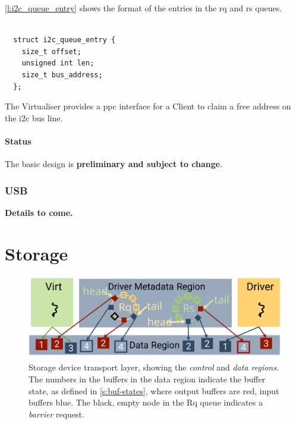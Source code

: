 \documentclass[a4paper,12pt]{report}
\newcommand{\ToCome}[1]{\textbf{#1 to come.}}
\newcommand{\Obj}[1]{\textsl{#1}}
\newcommand{\figscale}{0.2}
\begin{document}
\autoref{l:i2c_queue_entry} shows the format of the entries in the \gls{rq}
and \gls{rs} queues.

\begin{lstlisting}[gobble=2,firstline=2,float=th,
  label={l:i2c_queue_entry},
  caption={I2C request and response queue entry data structure.}]

  struct i2c_queue_entry {
    size_t offset;
    unsigned int len;
    size_t bus_address;
  };
\end{lstlisting}

The Virtualiser provides a \gls{ppc} interface for a Client to claim
a free address on the \gls{i2c} bus line.

\paragraph{Status}

The basic design is \textbf{preliminary and subject to change}.

\subsubsection{USB}\label{s:cl-usb}

\ToCome{Details}

\section{Storage}\label{s:cl-storage}

\begin{figure}[th]
  \centering
  \includegraphics[scale=\figscale]{metadata-storage}
  \caption[Storage device transport layer.]{Storage device transport layer, showing the
    \Obj{control} and \Obj{data regions}. The numbers in the
    buffers in the data region indicate the buffer state, as defined
    in \autoref{s:buf-states}, where output
    buffers are red, input buffers blue. The black, empty node in the
    Rq queue indicates a \emph{barrier} request.}
  \label{f:control-storage}
\end{figure}
\end{document}
